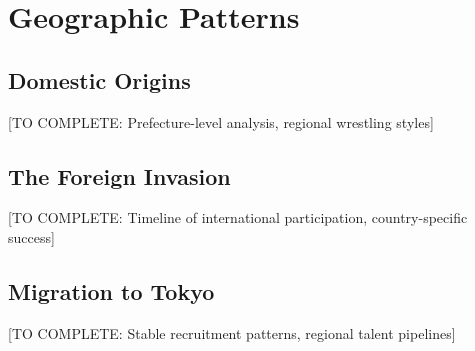 \section{Geographic Patterns}

\subsection{Domestic Origins}

[TO COMPLETE: Prefecture-level analysis, regional wrestling styles]

\subsection{The Foreign Invasion}

[TO COMPLETE: Timeline of international participation, country-specific success]

\subsection{Migration to Tokyo}

[TO COMPLETE: Stable recruitment patterns, regional talent pipelines]